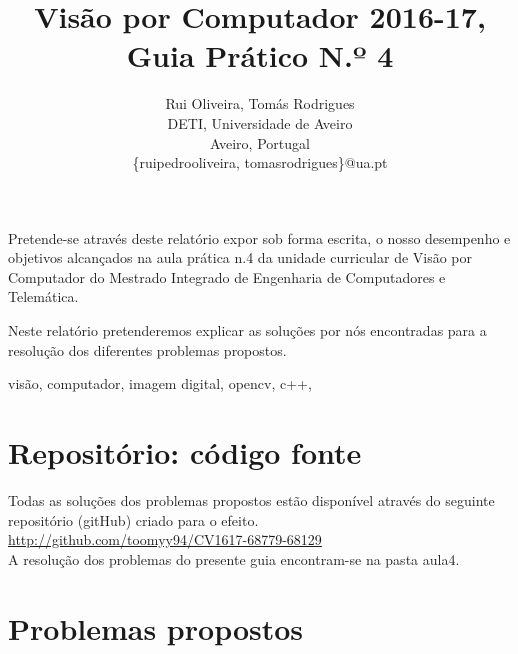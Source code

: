 \documentclass[portuguese, times, mirror]{revdetua}
\begin{document}

\title{Visão por Computador 2016-17, Guia Prático N.º 4}
\author{Rui Oliveira, Tomás Rodrigues\\ DETI, Universidade de Aveiro \\ Aveiro, Portugal \\ \{ruipedrooliveira, tomasrodrigues\}@ua.pt}
\maketitle

\begin{resumo}


Pretende-se através deste relatório expor sob forma escrita, o nosso desempenho e objetivos alcançados na aula prática n.4 da unidade curricular de Visão por Computador do Mestrado Integrado de Engenharia de Computadores e Telemática.

Neste relatório pretenderemos explicar as soluções por nós encontradas para a resolução dos diferentes problemas propostos.


\end{resumo} 

\begin{palavraschave} %
visão, computador, imagem digital, opencv, c++, 
 \end{palavraschave} %




\section{Repositório: código fonte}


Todas as soluções dos problemas propostos estão disponível através do seguinte repositório (gitHub) criado para o efeito. \\

\href{http://github.com/toomyy94/CV1617-68779-68129}{http://github.com/toomyy94/CV1617-68779-68129}
\\


A resolução dos problemas do presente guia encontram-se na pasta aula4. 



\section{Problemas propostos}
\end{document}
